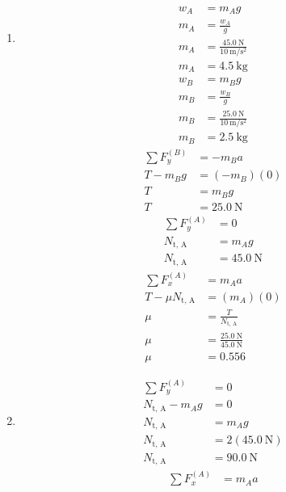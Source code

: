 \documentclass{article}
\begin{document}
\begin{enumerate}[label=\textbf{(\alph*)}]
	\item
		\begin{align*}
			w_A & = m_Ag \\
			m_A & = \frac{w_A}{g} \\
			m_A & = \frac{\SI{45.0}{\newton}}{\SI{10}{\meter \per \second \squared}} \\
			m_A & = \SI{4.5}{\kilogram}
		\end{align*}
		\begin{align*}
			w_B & = m_Bg \\
			m_B & = \frac{w_B}{g} \\
			m_B & = \frac{\SI{25.0}{\newton}}{\SI{10}{\meter \per \second \squared}} \\
			m_B & = \SI{2.5}{\kilogram}
		\end{align*}
		\begin{align*}
			\sum F_y^{(B)} & = -m_Ba \\
			T - m_Bg & = (-m_B)(0) \\
			T & = m_Bg \\
			T & = \SI{25.0}{\newton}
		\end{align*}
		\begin{align*}
			\sum F_y^{(A)} & = 0 \\
			N_\text{t, A} & = m_Ag \\
			N_\text{t, A} & = \SI{45.0}{\newton}
		\end{align*}
		\begin{align*}
			\sum F_x^{(A)} & = m_Aa \\
			T - \mu N_\text{t, A} & = (m_A)(0) \\
			\mu & = \frac{T}{N_\text{t, A}} \\
			\mu & = \frac{\SI{25.0}{\newton}}{\SI{45.0}{\newton}} \\
			\mu & = 0.556
		\end{align*}
	\item
		\begin{align*}
			\sum F_y^{(A)} & = 0 \\
			N_\text{t, A} - m_Ag & = 0 \\
			N_\text{t, A} & = m_Ag \\
			N_\text{t, A} & = 2(\SI{45.0}{\newton}) \\
			N_\text{t, A} & = \SI{90.0}{\newton}
		\end{align*}
		\begin{align*}
			\sum F_x^{(A)} & = m_Aa \\

\end{align*}
\end{enumerate}
\end{document}
